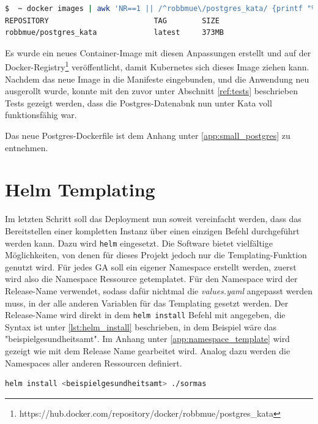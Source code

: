 \begin{lstlisting}[language=bash, caption={Größe des Debian Images}, label=lst:debian_postgres_size]
$  ~ docker images | awk 'NR==1 || /^robbmue\/postgres_kata/ {printf "%-33s %-10s %s\n", $1, $2, $NF}'
REPOSITORY                        TAG        SIZE
robbmue/postgres_kata             latest     373MB
\end{lstlisting}

Es wurde ein neues Container-Image mit diesen Anpassungen erstellt und auf der Docker-Registry\footnote{https://hub.docker.com/repository/docker/robbmue/postgres\_kata} veröffentlicht, damit Kubernetes sich dieses Image ziehen kann.
Nachdem das neue Image in die Manifeste eingebunden, und die Anwendung neu ausgerollt wurde, konnte mit den zuvor unter Abschnitt \ref{ref:tests} beschrieben Tests gezeigt werden, dass die Postgres-Datenabnk nun unter Kata voll funktionsfähig war.

Das neue Postgres-Dockerfile ist dem Anhang unter \ref{app:small_postgres} zu entnehmen.


\section{Helm Templating}
Im letzten Schritt soll das Deployment nun soweit vereinfacht werden, dass das Bereitstellen einer kompletten Instanz über einen einzigen Befehl durchgeführt werden kann.
Dazu wird \texttt{helm} eingesetzt. 
Die Software bietet vielfältige Möglichkeiten, von denen für dieses Projekt jedoch nur die Templating-Funktion genutzt wird.
Für jedes \ac{GA} soll ein eigener Namespace erstellt werden, zuerst wird also die Namespace Ressource getemplatet.
Für den Namespace wird der Release-Name verwendet, sodass dafür nichtmal die \textit{values.yaml} angepasst werden muss, in der alle anderen Variablen für das Templating gesetzt werden. 
Der Release-Name wird direkt in dem \texttt{helm install} Befehl mit angegeben, die Syntax ist unter \ref{lst:helm_install} beschrieben, in dem Beispiel wäre das "beispielgesundheitsamt".
Im Anhang unter \ref{app:namespace_template} wird gezeigt wie mit dem Release Name gearbeitet wird. 
Analog dazu werden die Namespaces aller anderen Ressourcen definiert. 

\begin{lstlisting}[language=bash, caption={Syntax des \texttt{helm install} Kommanods}, label=lst:helm_install]
helm install <beispielgesundheitsamt> ./sormas
\end{lstlisting}

